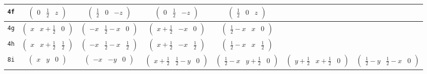 \documentclass[fleqn,9pt,landscape]{jsarticle}
\begin{document}
\begin{center}
\begin{longtable}{ccccccc}
{\tt 4f} & $ \begin{pmatrix} 0 & \frac{1}{2} & z \end{pmatrix} $ & $ \begin{pmatrix} \frac{1}{2} & 0 & - z \end{pmatrix} $ & $ \begin{pmatrix} 0 & \frac{1}{2} & - z \end{pmatrix} $ & $ \begin{pmatrix} \frac{1}{2} & 0 & z \end{pmatrix} $ & $  $ & $  $ \\ \hline
{\tt 4g} & $ \begin{pmatrix} x & x + \frac{1}{2} & 0 \end{pmatrix} $ & $ \begin{pmatrix} - x & \frac{1}{2} - x & 0 \end{pmatrix} $ & $ \begin{pmatrix} x + \frac{1}{2} & - x & 0 \end{pmatrix} $ & $ \begin{pmatrix} \frac{1}{2} - x & x & 0 \end{pmatrix} $ & $  $ & $  $ \\ \hline
{\tt 4h} & $ \begin{pmatrix} x & x + \frac{1}{2} & \frac{1}{2} \end{pmatrix} $ & $ \begin{pmatrix} - x & \frac{1}{2} - x & \frac{1}{2} \end{pmatrix} $ & $ \begin{pmatrix} x + \frac{1}{2} & - x & \frac{1}{2} \end{pmatrix} $ & $ \begin{pmatrix} \frac{1}{2} - x & x & \frac{1}{2} \end{pmatrix} $ & $  $ & $  $ \\ \hline
{\tt 8i} & $ \begin{pmatrix} x & y & 0 \end{pmatrix} $ & $ \begin{pmatrix} - x & - y & 0 \end{pmatrix} $ & $ \begin{pmatrix} x + \frac{1}{2} & \frac{1}{2} - y & 0 \end{pmatrix} $ & $ \begin{pmatrix} \frac{1}{2} - x & y + \frac{1}{2} & 0 \end{pmatrix} $ & $ \begin{pmatrix} y + \frac{1}{2} & x + \frac{1}{2} & 0 \end{pmatrix} $ & $ \begin{pmatrix} \frac{1}{2} - y & \frac{1}{2} - x & 0 \end{pmatrix} $ \\

\end{longtable}
\end{center}
\end{document}
